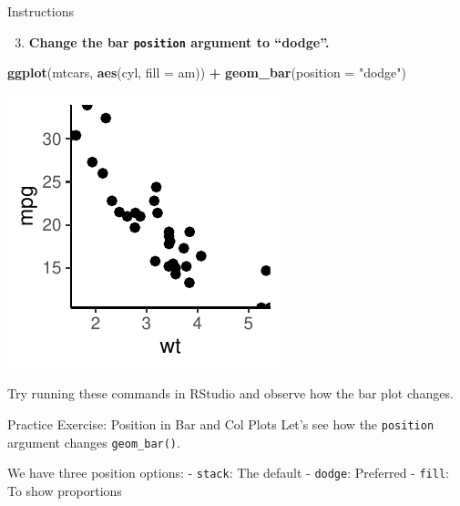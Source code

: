 \documentclass[
  ignorenonframetext,
]{beamer}
\newenvironment{Shaded}{\begin{snugshade}}{\end{snugshade}}
\newcommand{\AttributeTok}[1]{\textcolor[rgb]{0.13,0.29,0.53}{#1}}
\newcommand{\FunctionTok}[1]{\textcolor[rgb]{0.13,0.29,0.53}{\textbf{#1}}}
\newcommand{\NormalTok}[1]{#1}
\newcommand{\SpecialCharTok}[1]{\textcolor[rgb]{0.81,0.36,0.00}{\textbf{#1}}}
\newcommand{\StringTok}[1]{\textcolor[rgb]{0.31,0.60,0.02}{#1}}
\providecommand{\tightlist}{%
  \setlength{\itemsep}{0pt}\setlength{\parskip}{0pt}}
\begin{document}
\begin{frame}[fragile]{Instructions}
\label{instructions-2}
\begin{enumerate}
\setcounter{enumi}{2}
\tightlist
\item
  \textbf{Change the bar \texttt{position} argument to ``dodge''.}
\end{enumerate}


\begin{Shaded}
\begin{Highlighting}[]
\FunctionTok{ggplot}\NormalTok{(mtcars, }\FunctionTok{aes}\NormalTok{(cyl, }\AttributeTok{fill =}\NormalTok{ am)) }\SpecialCharTok{+} \FunctionTok{geom\_bar}\NormalTok{(}\AttributeTok{position =} \StringTok{"dodge"}\NormalTok{)}
\end{Highlighting}
\end{Shaded}

\begin{center}\includegraphics[width=0.5\linewidth]{Figs/unnamed-chunk-46-1} \end{center}

Try running these commands in RStudio and observe how the bar plot
changes.
\end{frame}

\begin{frame}[fragile]{Practice Exercise: Position in Bar and Col Plots}
\label{practice-exercise-position-in-bar-and-col-plots-1}
Let's see how the \texttt{position} argument changes
\texttt{geom\_bar()}.

We have three position options: - \texttt{stack}: The default -
\texttt{dodge}: Preferred - \texttt{fill}: To show proportions
\end{frame}
\end{document}

